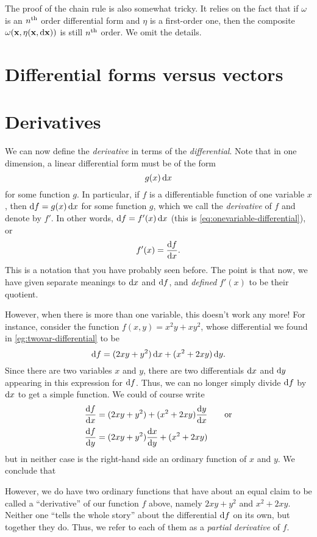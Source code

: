 \documentclass[12pt]{amsart}
\begin{document}
The proof of the chain rule is also somewhat tricky.
It relies on the fact that if $\omega$ is an $n^{\mathrm{th}}$ order differential form and $\eta$ is a first-order one, then the composite $\omega(\mathbf{x},\eta(\mathbf{x},\mathrm{d} \mathbf{x}))$ is still $n^{\mathrm{th}}$ order.
We omit the details.


\section{Differential forms versus vectors}
\label{sec:forms-vs-vectors}


\section{Derivatives}
\label{sec:derivatives}

We can now define the \emph{derivative} in terms of the \emph{differential}.
Note that in one dimension, a linear differential form must be of the form
\[ g(x) \,\mathrm{d} x \]
for some function $g$.
In particular, if $f$ is a differentiable function of one variable $x$, then $\mathrm{d} f = g(x) \, \mathrm{d} x$ for some function $g$, which we call the \emph{derivative} of $f$ and denote by $f'$.
In other words, $\mathrm{d} f = f'(x)\,\mathrm{d} x$ (this is \cref{eq:onevariable-differential}), or
\[ f'(x) = \frac{\mathrm{d} f}{\mathrm{d} x}. \]
This is a notation that you have probably seen before.
The point is that now, we have given separate meanings to $\mathrm{d} x$ and $\mathrm{d} f$, and \emph{defined} $f'(x)$ to be their quotient.

However, when there is more than one variable, this doesn't work any more!
For instance, consider the function $f(x,y) = x^2y + xy^2$, whose differential we found in \cref{eg:twovar-differential} to be
\[ \mathrm{d} f = (2xy + y^2)\,\mathrm{d} x + (x^2+2xy)\,\mathrm{d} y.\]
Since there are two variables $x$ and $y$, there are two differentials $\mathrm{d} x$ and $\mathrm{d} y$ appearing in this expression for $\mathrm{d} f$.
Thus, we can no longer simply divide $\mathrm{d} f$ by $\mathrm{d} x$ to get a simple function.
We could of course write
\begin{align*}
  \frac{\mathrm{d} f}{\mathrm{d} x} &= (2xy + y^2) + (x^2+2xy)\frac{\mathrm{d} y}{\mathrm{d} x} \qquad\text{or}\\[2pt]
  \frac{\mathrm{d} f}{\mathrm{d} y} &= (2xy + y^2)\frac{\mathrm{d} x}{\mathrm{d} y} + (x^2+2xy)
\end{align*}
but in neither case is the right-hand side an ordinary function of $x$ and $y$.
We conclude that\\
\begin{center}
\end{center}
\vspace{5mm}
However, we do have two ordinary functions that have about an equal claim to be called a ``derivative'' of our function $f$ above, namely $2xy + y^2$ and $x^2+2xy$.
Neither one ``tells the whole story'' about the differential $\mathrm{d} f$ on its own, but together they do.
Thus, we refer to each of them as a \emph{partial derivative} of $f$.
\end{document}
